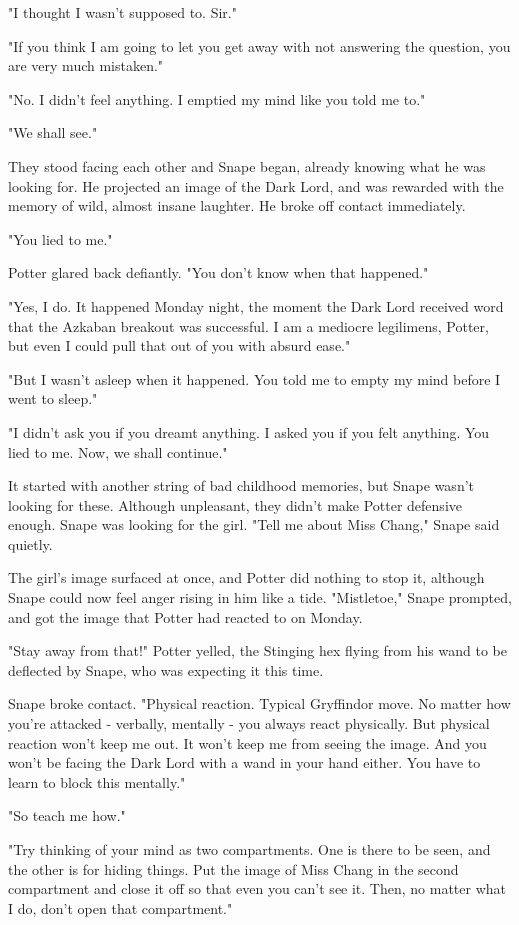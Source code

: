 "I thought I wasn't supposed to. Sir."

"If you think I am going to let you get away with not answering the question, you are very much mistaken."

"No. I didn't feel anything. I emptied my mind like you told me to."

"We shall see."

They stood facing each other and Snape began, already knowing what he was looking for. He projected an image of the Dark Lord, and was rewarded with the memory of wild, almost insane laughter. He broke off contact immediately.

"You lied to me."

Potter glared back defiantly. "You don't know when that happened."

"Yes, I do. It happened Monday night, the moment the Dark Lord received word that the Azkaban breakout was successful. I am a mediocre legilimens, Potter, but even I could pull that out of you with absurd ease."

"But I wasn't asleep when it happened. You told me to empty my mind before I went to sleep."

"I didn't ask you if you dreamt anything. I asked you if you felt anything. You lied to me. Now, we shall continue."

It started with another string of bad childhood memories, but Snape wasn't looking for these. Although unpleasant, they didn't make Potter defensive enough. Snape was looking for the girl. "Tell me about Miss Chang," Snape said quietly.

The girl's image surfaced at once, and Potter did nothing to stop it, although Snape could now feel anger rising in him like a tide. "Mistletoe," Snape prompted, and got the image that Potter had reacted to on Monday.

"Stay away from that!" Potter yelled, the Stinging hex flying from his wand to be deflected by Snape, who was expecting it this time.

Snape broke contact. "Physical reaction. Typical Gryffindor move. No matter how you're attacked - verbally, mentally - you always react physically. But physical reaction won't keep me out. It won't keep me from seeing the image. And you won't be facing the Dark Lord with a wand in your hand either. You have to learn to block this mentally."

"So teach me how."

"Try thinking of your mind as two compartments. One is there to be seen, and the other is for hiding things. Put the image of Miss Chang in the second compartment and close it off so that even you can't see it. Then, no matter what I do, don't open that compartment."

